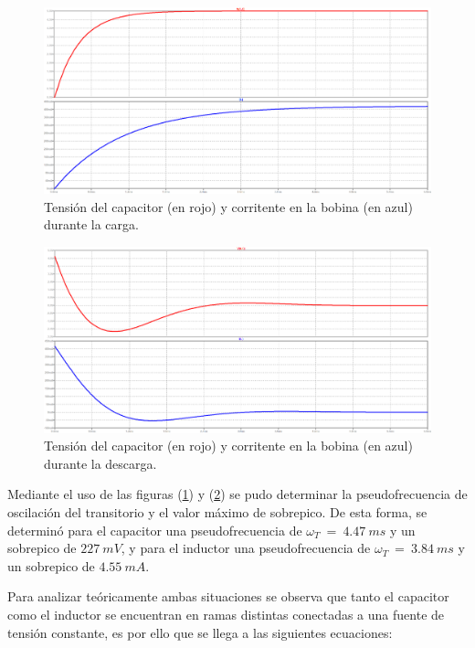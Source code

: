 \documentclass[a4paper]{article}
\begin{document}
\begin{figure}[H]
	\centering
	\includegraphics[width=\textwidth]{LTSpice-Carga1}
	\caption{Tensión del capacitor (en rojo) y corritente en la bobina (en azul) durante la carga.}
	\label{fig:LTSC1}
\end{figure}

\begin{figure}[H]
	\centering
	\includegraphics[width=\textwidth]{LTSpice-Descarga1}
	\caption{Tensión del capacitor (en rojo) y corritente en la bobina (en azul) durante la descarga.}
	\label{fig:LTSD1}
\end{figure}

Mediante el uso de las figuras (\ref{fig:LTSC1}) y (\ref{fig:LTSD1}) se pudo determinar la pseudofrecuencia de oscilación del transitorio y el valor máximo de sobrepico. De esta forma, se determinó para el capacitor una pseudofrecuencia de ${\omega}_{T} \ = \ 4.47 \ ms$ y un sobrepico de $227 \ mV$, y para el inductor una pseudofrecuencia de ${\omega}_{T} \ = \ 3.84 \ ms$ y un sobrepico de $4.55 \ mA$.

Para analizar teóricamente ambas situaciones se observa que tanto el capacitor como el inductor se encuentran en ramas distintas conectadas a una fuente de tensión constante, es por ello que se llega a las siguientes ecuaciones:
\end{document}
